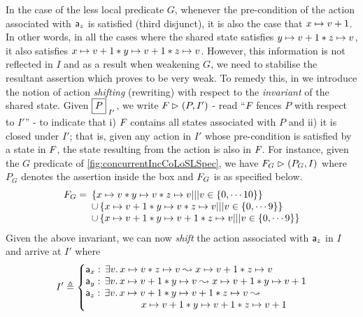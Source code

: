In the case of the less local predicate $G$, whenever the
pre-condition of the action associated with $\mathsf{a}_z$ is satisfied
(third disjunct), it is also the case that $x \mapsto v+1$. In other
words, in all the cases where the shared state satisfies
$y \mapsto v+1 * z \mapsto v$, it also satisfies $x \mapsto v+1 *
y \mapsto v+1 * z \mapsto v$. However, this information is not
reflected in $I$ and as a result when weakening $G$, we need to
stabilise the resultant assertion which proves to be very weak. To
remedy this, in \colosl we introduce the notion of action
\emph{shifting} (rewriting) with respect to the \emph{invariant} of
the shared state. Given $\shared{P}{I'}$, we write $F_{} \mathrel{\rhd}
(P, I')$ - read ``$F_{}$ fences $P$ with respect to $I'$'' - to
indicate that i) $F_{}$ contains all states associated with $P$
and ii) it is closed under $I'$; that is, given any action in $I'$
whose pre-condition is satisfied by a state in $F_{}$, the state
resulting from the action is also in $F_{}$. For instance, given
the $G$ predicate of \fig\ref{fig:concurrentIncCoLoSLSpec}, we have
$F_{G} \mathrel{\rhd} (P_G, I)$ where $P_G$ denotes the assertion inside
the box and $F_{G}$ is as specified below.
\[
	\begin{array}{l l}
		F_{G} = \hspace*{-5pt}& \left\{x \mapsto v * y \mapsto v * z \mapsto v ||| v \in \{0, \cdots 10\} \right\} \\
		& \cup \left\{x \mapsto v+1 * y \mapsto v * z \mapsto v ||| v \in \{0, \cdots 9 \} \right\} \\
		& \cup \left\{x \mapsto v+1 * y \mapsto v+1 * z \mapsto v ||| v \in \{0, \cdots 9\} \right\}\\
	\end{array}
\]
Given the above invariant, we can now \emph{shift} the action associated with $\mathsf{a}_z$ in $I$ and arrive at $I'$ where
\[
	I' \eqdef \left\{
		\begin{array}{@{}l@{}}
			\token a_x:\, \exsts{v} \cell{x}{v} * \cell{z}{v}  \swap  \cell{x}{v+1} * \cell{z}{v}\\
			\token a_y:\, \exsts{v} \cell{x}{v+1} * \cell{y}{v}  \swap  \cell{x}{v+1} * \cell{y}{v+1}\\
			\token a_z:\, \exsts{v} \cell{x}{v+1} *
                        \cell{y}{v+1} * \cell{z}{v} \swap\null\\
			\hspace*{2cm} \cell{x}{v+1} * \cell{y}{v+1} * \cell{z}{v+1}\\
		\end{array}			
	\right.
\]
